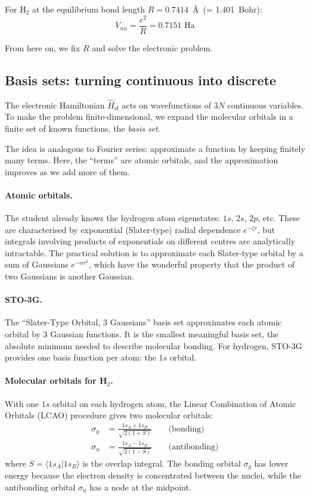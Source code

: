 \documentclass[aps,prb,preprint,longbibliography,nofootinbib]{revtex4-2}
\begin{document}
For H$_2$ at the equilibrium bond length $R = 0.7414$~\AA\ (= 1.401~Bohr):
\begin{equation}
V_{nn} = \frac{e^2}{R} = 0.7151\text{~Ha}
\end{equation}

From here on, we fix $R$ and solve the electronic problem.

\subsection{Basis sets: turning continuous into discrete}

The electronic Hamiltonian $\hat{H}_\text{el}$ acts on wavefunctions of
$3N$ continuous variables.  To make the problem finite-dimensional, we
expand the molecular orbitals in a finite set of known functions, the
\emph{basis set}.

The idea is analogous to Fourier series: approximate a function by
keeping finitely many terms.  Here, the ``terms'' are atomic orbitals,
and the approximation improves as we add more of them.

\paragraph{Atomic orbitals.}
The student already knows the hydrogen atom eigenstates: $1s$, $2s$,
$2p$, etc.  These are characterised by exponential (Slater-type) radial
dependence $e^{-\zeta r}$, but integrals involving products of
exponentials on different centres are analytically intractable.  The
practical solution is to approximate each Slater-type orbital by a sum
of Gaussians $e^{-\alpha r^2}$, which have the wonderful property that
the product of two Gaussians is another Gaussian.

\paragraph{STO-3G.}
The ``Slater-Type Orbital, 3 Gaussians'' basis set approximates each
atomic orbital by 3 Gaussian functions.  It is the smallest meaningful
basis set, the absolute minimum needed to describe molecular bonding.
For hydrogen, STO-3G provides one basis function per atom: the $1s$
orbital.

\paragraph{Molecular orbitals for H$_2$.}
With one $1s$ orbital on each hydrogen atom, the Linear Combination of
Atomic Orbitals (LCAO) procedure gives two molecular orbitals:
\begin{align}
\sigma_g &= \frac{1s_A + 1s_B}{\sqrt{2(1+S)}} \qquad\text{(bonding)}
\label{eq:bonding}\\[6pt]
\sigma_u &= \frac{1s_A - 1s_B}{\sqrt{2(1-S)}} \qquad\text{(antibonding)}
\label{eq:antibonding}
\end{align}
where $S = \langle 1s_A | 1s_B \rangle$ is the overlap integral.  The
bonding orbital $\sigma_g$ has lower energy because the electron density
is concentrated between the nuclei, while the antibonding orbital
$\sigma_u$ has a node at the midpoint.
\end{document}
